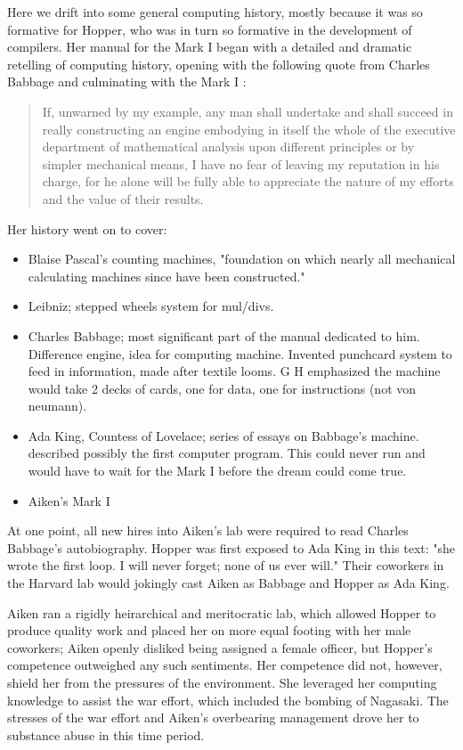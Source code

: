 Here we drift into some general computing history, mostly because it was so 
formative for Hopper, who was in turn so formative in the development of 
compilers.
Her manual for the Mark I began with a detailed and dramatic retelling of
computing history, opening with the following quote from Charles Babbage and
culminating with the Mark I
\cite{annals_of_the_computation_laboratory_of_harvard_university_1946}:

\begin{quotation}
If, unwarned by my example, any man shall undertake and shall succeed in 
really constructing an engine embodying in itself the whole of the executive 
department of mathematical analysis upon different principles or by simpler 
mechanical means, I have no fear of leaving my reputation in his charge, for he 
alone will be fully able to appreciate the nature of my efforts and the value 
of their results.
\end{quotation}

Her history went on to cover:

\begin{itemize}
    \item Blaise Pascal's counting machines, "foundation on which nearly all mechanical calculating machines since have been constructed."
    \item Leibniz; stepped wheels system for mul/divs.
    \item Charles Babbage; most significant part of the manual dedicated to him.
          Difference engine, idea for computing machine. Invented punchcard system to feed in information, made after textile looms.
          G H emphasized the machine would take 2 decks of cards, one for data, one for instructions (not von neumann).
    \item Ada King, Countess of Lovelace; series of essays on Babbage's machine.
          described possibly the first computer program. This could never run and would
          have to wait for the Mark I before the dream could come true.
    \item Aiken's Mark I
\end{itemize}

At one point, all new hires into Aiken's lab were required to read
Charles Babbage's autobiography.
Hopper was first exposed to Ada King in this text:
"she wrote the first loop. I will never forget; none of us ever will."
Their coworkers in the Harvard lab would jokingly cast Aiken as Babbage and Hopper as Ada King.

Aiken ran a rigidly heirarchical and meritocratic lab, which allowed Hopper
to produce quality work and placed her on more equal footing with her
male coworkers; Aiken openly disliked being assigned a female officer,
but Hopper's competence outweighed any such sentiments.
Her competence did not, however, shield her from the pressures of the environment.
She leveraged her computing knowledge to assist the war effort,
which included the bombing of Nagasaki.
The stresses of the war effort and Aiken's overbearing management drove her to
substance abuse in this time period.

